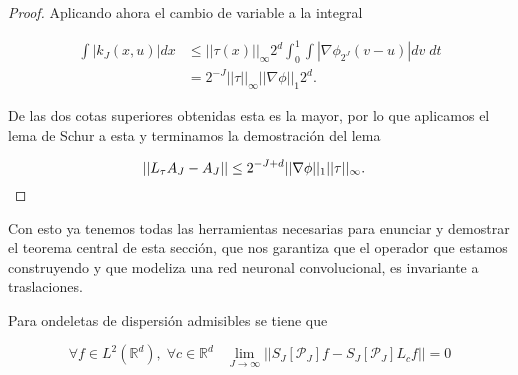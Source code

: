 \begin{proof}
  \noindent Aplicando ahora el cambio de variable a la integral

  \begin{align*}
    \int |k_J(x,u)| dx &\leq ||\tau(x)||_\infty 2^d \int_0^1 \int \left| \nabla \phi_{2^J} (v-u)\right| dv \; dt \\
    &= 2^{-J} ||\tau||_\infty ||\nabla \phi ||_1 2^{d}.
  \end{align*}

  \noindent De las dos cotas superiores obtenidas esta es la mayor, por lo que aplicamos el lema de Schur a esta y terminamos la demostración del lema

  $$ ||L_{\tau} A_J - A_J || \leq 2^{-J+d} ||\nabla \phi ||_1 ||\tau||_\infty. \;\;\; \qedhere$$
\end{proof}


\noindent Con esto ya tenemos todas las herramientas necesarias para enunciar y demostrar el teorema central de esta sección, que nos garantiza que el operador que estamos construyendo y que modeliza una red neuronal convolucional, es invariante a traslaciones.

\begin{teorema} \label{invarianzaTraslaciones}
Para ondeletas de dispersión admisibles se tiene que 

$$\forall f \in L^2(\mathbb{R}^d), \; \forall c\in \mathbb{R}^d \;\;\; \lim_{J\rightarrow \infty}||S_J[\mathcal{P}_J] f-S_J[\mathcal{P}_J] L_cf||=0$$
\end{teorema}


